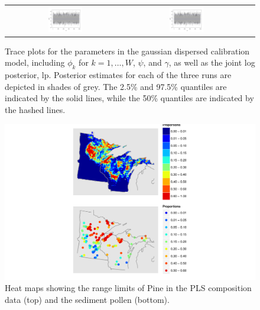 \begin{figure}
\begin{tabular}{ccc}
  \includegraphics[page=14,width=0.3\textwidth]{figures/cal_trace.pdf} &
  \includegraphics[page=15,width=0.3\textwidth]{figures/cal_trace.pdf} 
\end{tabular}
\caption{Trace plots for the parameters in the gaussian dispersed calibration model, including $\phi_k$ for $k=1, \ldots, W$, $\psi$, and $\gamma$, as well as the joint log posterior, $\text{lp}$. Posterior estimates for each of the three runs are depicted in shades of grey. The 2.5\% and 97.5\% quantiles are indicated by the solid lines, while the 50\% quantiles are indicated by the hashed lines.}
\label{fig:trace}
\end{figure}

\begin{figure}
\centering
\includegraphics[width=7in]{figures/maps_compare_PINE.pdf}
\caption{Heat maps showing the range limits of Pine in the PLS composition data (top) and the sediment pollen (bottom).}
\label{fig:compare_maps_PINE}
\end{figure}

